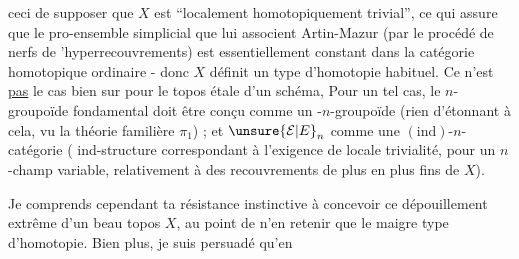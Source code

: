 %
ceci de supposer que $X$ est ``localement homotopiquement trivial'', ce qui assure que le pro-ensemble simplicial que lui associent Artin-Mazur (par le procédé de nerfs de 'hyperrecouvrements) est essentiellement constant dans la catégorie homotopique ordinaire - donc $X$ définit un type d'homotopie habituel. Ce n'est \uline{pas} le cas bien sur pour le topos étale d'un schéma, Pour un tel cas, le $n$-groupoïde fondamental doit être conçu comme un -$n$-groupoïde (rien d'étonnant à cela, vu la théorie familière  $\pi_1$) ; et $\unsure{\mathcal E|E}_n$ comme une $(\mathrm{ind})$-$n$-catégorie ( ind-structure correspondant à l'exigence de locale trivialité, pour un $n$-champ variable, relativement à des recouvrements de plus en plus fins de $X$).


Je comprends cependant ta résistance instinctive à concevoir ce dépouillement extrême d'un beau topos $X$, au point de%
n'en retenir que le maigre type d'homotopie. Bien plus, je suis persuadé qu'en%
